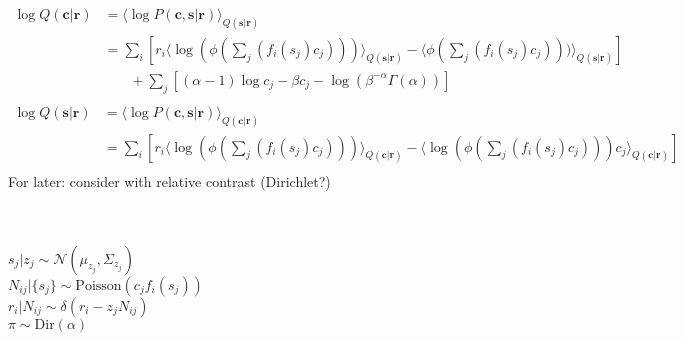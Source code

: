 \documentclass[12pt]{article}
\begin{document}
\begin{equation}
\begin{aligned}
\log Q(\mathbf{c|r}) &= \langle \log P(\mathbf{c, s|r}) \rangle_{Q(\mathbf{s|r})}\\
&= \sum_i [r_i \langle \log(\phi(\sum_j(f_i(s_j)c_j))) \rangle_{Q(\mathbf{s|r})} - \langle \phi(\sum_j(f_i(s_j)c_j))) \rangle_{Q(\mathbf{s|r})}]\\
& \phantom{{}=1}+ \sum_j [(\alpha - 1) \log c_j - \beta c_j - \log (\beta^{- \alpha} \Gamma (\alpha))]\\
\end{aligned}
\end{equation}
\begin{equation}
\begin{aligned}
\log Q(\mathbf{s|r}) &= \langle \log P(\mathbf{c, s|r}) \rangle_{Q(\mathbf{c|r})}\\
&= \sum_i [r_i \langle \log(\phi(\sum_j(f_i(s_j)c_j))) \rangle_{Q(\mathbf{c|r})} - \langle \log(\phi(\sum_j(f_i(s_j)c_j))) c_j \rangle_{Q(\mathbf{c|r})}]\\
\end{aligned}
\end{equation}
For later: consider with relative contrast (Dirichlet?)\\
\\
\\
$s_j|z_j \sim \mathcal{N}(\mu_{z_j}, \Sigma_{z_j})$\\
$N_{ij}|\{s_j\}  \sim \text{Poisson}(c_j f_i(s_j))$\\
$r_i|N_{ij} \sim \delta(r_i - z_j N_{ij})$\\
$\pi \sim \text{Dir} (\alpha)$\\
\end{document}
